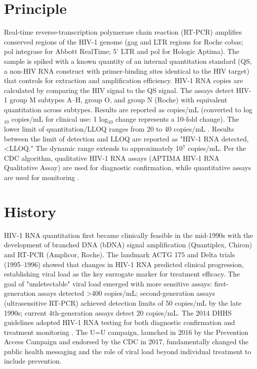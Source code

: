 \section*{Principle}
Real-time reverse-transcription polymerase chain reaction (RT-PCR) amplifies conserved regions of the HIV-1 genome (gag and LTR regions for Roche cobas; pol integrase for Abbott RealTime; 5' LTR and pol for Hologic Aptima). The sample is spiked with a known quantity of an internal quantitation standard (QS, a non-HIV RNA construct with primer-binding sites identical to the HIV target) that controls for extraction and amplification efficiency. HIV-1 RNA copies are calculated by comparing the HIV signal to the QS signal. The assays detect HIV-1 group M subtypes A--H, group O, and group N (Roche) with equivalent quantitation across subtypes. Results are reported as copies/mL (converted to log$_{10}$ copies/mL for clinical use: 1 log$_{10}$ change represents a 10-fold change). The lower limit of quantitation/LLOQ ranges from 20 to 40 copies/mL \cite{sollis2014systematic}. Results between the limit of detection and LLOQ are reported as "HIV-1 RNA detected, <LLOQ." The dynamic range extends to approximately 10$^7$ copies/mL. Per the CDC algorithm, qualitative HIV-1 RNA assays (APTIMA HIV-1 RNA Qualitative Assay) are used for diagnostic confirmation, while quantitative assays are used for monitoring \cite{eshleman2014analysis}.

\section*{History}
HIV-1 RNA quantitation first became clinically feasible in the mid-1990s with the development of branched DNA (bDNA) signal amplification (Quantiplex, Chiron) and RT-PCR (Amplicor, Roche). The landmark ACTG 175 and Delta trials (1995--1996) showed that changes in HIV-1 RNA predicted clinical progression, establishing viral load as the key surrogate marker for treatment efficacy. The goal of "undetectable" viral load emerged with more sensitive assays: first-generation assays detected >400 copies/mL; second-generation assays (ultrasensitive RT-PCR) achieved detection limits of 50 copies/mL by the late 1990s; current 4th-generation assays detect 20 copies/mL. The 2014 DHHS guidelines adopted HIV-1 RNA testing for both diagnostic confirmation and treatment monitoring \cite{dhhs2023guidelines}. The U=U campaign, launched in 2016 by the Prevention Access Campaign and endorsed by the CDC in 2017, fundamentally changed the public health messaging and the role of viral load beyond individual treatment to include prevention.

